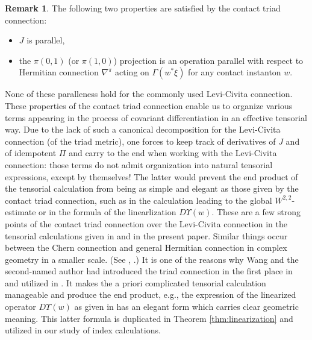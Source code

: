 \documentclass[reqno]{amsart}
\theoremstyle{theorem}
\theoremstyle{definition}
\newtheorem{rem}[thm]{Remark}
\numberwithin{equation}{section}
\begin{document}
\begin{rem} \label{rem:triad-connection}
The following two properties are satisfied by the contact triad connection:
\begin{itemize}
\item $J$ is parallel,
\item the $\pi(0,1)$ (or $\pi(1,0)$) projection is an operation parallel with respect to
Hermitian connection $\nabla^\pi$ acting on $\Gamma(w^*\xi)$ for any contact instanton $w$.
\end{itemize}
None of these paralleness  hold for the commonly used Levi-Civita connection.
These properties of the contact triad connection enable us to
organize various terms appearing in the process of covariant differentiation
in an effective tensorial way. Due to the lack of such a canonical decomposition
for the Levi-Civita connection (of the triad metric), one forces to keep track
of derivatives of $J$ and of idempotent $\Pi$ and carry to the end when working with
the Levi-Civita connection: those terms do not admit organization into natural tensorial
expressions, except by themselves!
The latter would prevent the end product of the tensorial calculation from being as
simple and elegant as those given by the contact triad connection, such as in the
calculation leading to the global $W^{2,2}$-estimate or in the formula of the linearlization
$D\Upsilon(w)$. These are a few strong points  of the contact triad connection
over the Levi-Civita connection in the tensorial calculations  given in
\cite{oh-wang:CR-map1,oh-wang:CR-map2,oh:contacton}
and in the present paper.  Similar things occur
between the Chern connection and general Hermitian connection in complex geometry
in a smaller scale. (See \cite{chern:connection}, \cite[Chapter 7]{oh:book1}.)
It is one of the reasons why Wang and the second-named author had
introduced the triad connection in the first place in \cite{oh-wang:connection}
and utilized in \cite{oh-wang:CR-map1,oh-wang:CR-map2}. It
makes the a priori complicated tensorial calculation manageable and produce the end product, e.g.,
the expression of the linearized operator $D\Upsilon(w)$ as given in
\cite[Theorem 10.1]{oh:contacton} has an elegant form which carries
clear geometric meaning. This latter formula  is duplicated in Theorem \ref{thm:linearization}
and utilized in our study of index calculations.
\end{rem}





\end{document}
